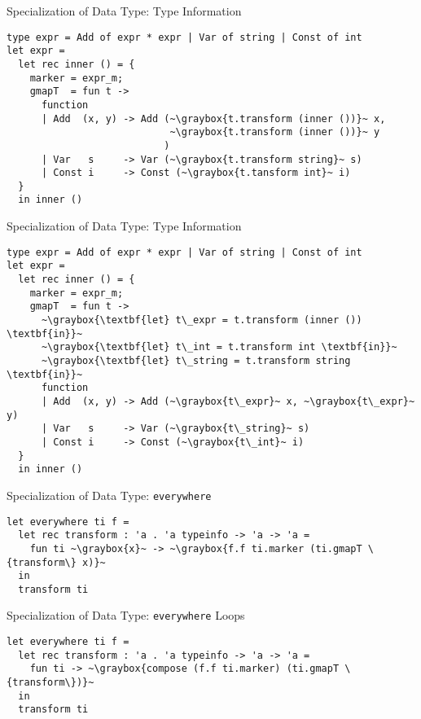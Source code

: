 \begin{frame}[fragile]{Specialization of Data Type: Type Information}
\begin{lstlisting}
type expr = Add of expr * expr | Var of string | Const of int
let expr = 
  let rec inner () = {
    marker = expr_m; 
    gmapT  = fun t -> 
      function 
      | Add  (x, y) -> Add (~\graybox{t.transform (inner ())}~ x, 
                            ~\graybox{t.transform (inner ())}~ y
                           )
      | Var   s     -> Var (~\graybox{t.transform string}~ s)
      | Const i     -> Const (~\graybox{t.tansform int}~ i)
  }
  in inner ()
\end{lstlisting}
\vskip6mm
\end{frame}

\begin{frame}[fragile]{Specialization of Data Type: Type Information}
\begin{lstlisting}
type expr = Add of expr * expr | Var of string | Const of int
let expr = 
  let rec inner () = {
    marker = expr_m; 
    gmapT  = fun t -> 
      ~\graybox{\textbf{let} t\_expr = t.transform (inner ()) \textbf{in}}~
      ~\graybox{\textbf{let} t\_int = t.transform int \textbf{in}}~
      ~\graybox{\textbf{let} t\_string = t.transform string \textbf{in}}~
      function 
      | Add  (x, y) -> Add (~\graybox{t\_expr}~ x, ~\graybox{t\_expr}~ y)
      | Var   s     -> Var (~\graybox{t\_string}~ s)
      | Const i     -> Const (~\graybox{t\_int}~ i)
  }
  in inner ()
\end{lstlisting}
\end{frame}

\begin{frame}[fragile]{Specialization of Data Type: \texttt{everywhere}}
\begin{lstlisting}
let everywhere ti f =
  let rec transform : 'a . 'a typeinfo -> 'a -> 'a = 
    fun ti ~\graybox{x}~ -> ~\graybox{f.f ti.marker (ti.gmapT \{transform\} x)}~
  in
  transform ti
\end{lstlisting}
\end{frame}

\begin{frame}[fragile]{Specialization of Data Type: \texttt{everywhere} Loops}
\begin{lstlisting}
let everywhere ti f =
  let rec transform : 'a . 'a typeinfo -> 'a -> 'a = 
    fun ti -> ~\graybox{compose (f.f ti.marker) (ti.gmapT \{transform\})}~
  in
  transform ti
\end{lstlisting}
\end{frame}

